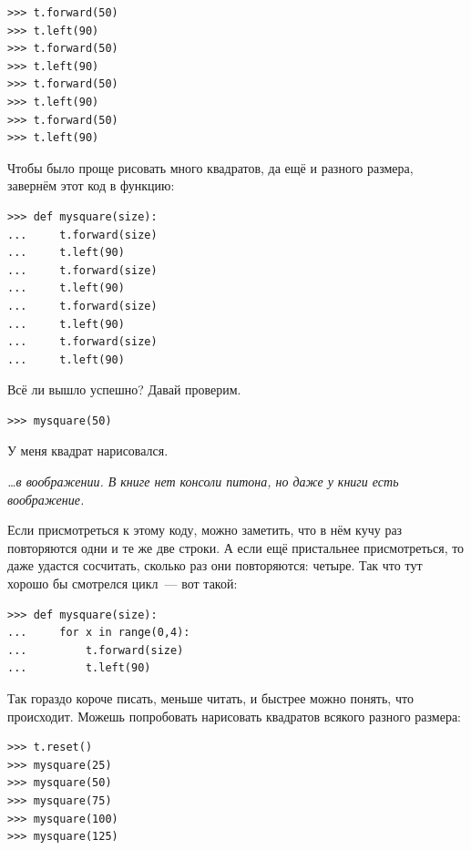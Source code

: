 \begin{listing}
\begin{verbatim}
>>> t.forward(50)
>>> t.left(90)
>>> t.forward(50)
>>> t.left(90)
>>> t.forward(50)
>>> t.left(90)
>>> t.forward(50)
>>> t.left(90)
\end{verbatim}
\end{listing}

Чтобы было проще рисовать много квадратов, да ещё и разного размера, завернём этот код в функцию:

\begin{listing}
\begin{verbatim}
>>> def mysquare(size):
...     t.forward(size)
...     t.left(90)
...     t.forward(size)
...     t.left(90)
...     t.forward(size)
...     t.left(90)
...     t.forward(size)
...     t.left(90)
\end{verbatim}
\end{listing}

Всё ли вышло успешно? Давай проверим.

\begin{listing}
\begin{verbatim}
>>> mysquare(50)
\end{verbatim}
\end{listing}

У меня квадрат нарисовался.

\emph {…в воображении. В книге нет консоли питона, но даже у книги есть воображение.}

Если присмотреться к этому коду, можно заметить, что в нём кучу раз повторяются одни и те же две строки. А если ещё пристальнее присмотреться, то даже удастся сосчитать, сколько раз они повторяются: четыре. Так что тут хорошо бы смотрелся цикл — вот такой:

\begin{listing}
\begin{verbatim}
>>> def mysquare(size):
...     for x in range(0,4):
...         t.forward(size)
...         t.left(90)
\end{verbatim}
\end{listing}

Так гораздо короче писать, меньше читать, и быстрее можно понять, что происходит. Можешь попробовать нарисовать квадратов всякого разного размера:

\begin{listing}
\begin{verbatim}
>>> t.reset()
>>> mysquare(25)
>>> mysquare(50)
>>> mysquare(75)
>>> mysquare(100)
>>> mysquare(125)
\end{verbatim}
\end{listing}

